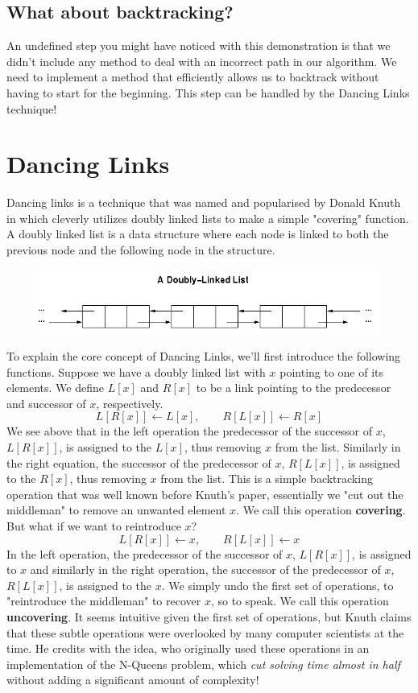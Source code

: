 \documentclass{article}
\begin{document}
\subsection{What about backtracking?}
An undefined step you might have noticed with this demonstration is that we didn't include any method to deal with an incorrect path in our algorithm. We need to implement a method that efficiently allows us to backtrack without having to start for the beginning. This step can be handled by the Dancing Links technique!
\clearpage
\section{Dancing Links}
Dancing links is a technique that was named and popularised by Donald Knuth in \cite{dlx} which cleverly utilizes doubly linked lists to make a simple "covering" function. A doubly linked list is a data structure where each node is linked to both the previous node and the following node in the structure.

\begin{center}
\begin{figure}[ht]
\includegraphics[scale=0.75]{images/linkedlist.png}
\label{fig: Linked lists}
\end{figure}
\end{center}
 To explain the core concept of Dancing Links, we'll first introduce the following functions. Suppose we have a doubly linked list with $x$ pointing to one of its elements. We define $L[x]$ and $R[x]$ to be a link pointing to the predecessor and successor of $x$, respectively. 
$$L[R[x]] \leftarrow L[x], \quad \quad R[L[x]] \leftarrow R[x]$$
We see above that in the left operation the predecessor of the successor of $x$, $L[R[x]]$, is assigned to the $L[x]$, thus removing $x$ from the list. Similarly in the right equation, the successor of the predecessor of $x$, $R[L[x]]$, is assigned to the $R[x]$, thus removing $x$ from the list. This is a simple backtracking operation that was well known before Knuth's paper, essentially we "cut out the middleman" to remove an unwanted element $x$. We call this operation \textbf{covering}. But what if we want to reintroduce $x$?
$$L[R[x]] \leftarrow x ,\quad \quad R[L[x]] \leftarrow x$$
In the left operation, the predecessor of the successor of $x$, $L[R[x]]$, is assigned to $x$ and similarly in the right operation, the successor of the predecessor of $x$, $R[L[x]]$, is assigned to the $x$. We simply undo the first set of operations, to "reintroduce the middleman" to recover $x$, so to speak. We call this operation \textbf{uncovering}. It seems intuitive given the first set of operations, but Knuth claims that these subtle operations were overlooked by many computer scientists at the time. He credits \cite{first} with the idea, who originally used these operations in an implementation of the N-Queens problem, which \textit{cut solving time almost in half} without adding a significant amount of complexity!
\end{document}
